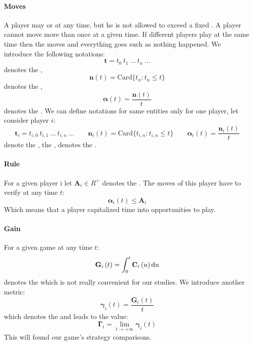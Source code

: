 \paragraph{Moves}
A player may  or  at any time, but he is
not allowed to exceed a fixed . A player cannot move  
more than once at a given time. If different players play at the same time then 
the moves  and everything goes such as nothing happened. We      
introduce the following notations:
\[ \textbf{t} = t_0 \: t_1 \: \dots \: t_n \: \dots \]
denotes the ,
\newpage
\[ \textbf{n} \left( t \right) = \mathrm{Card} \{t_n : t_n \leq t \} \]
denotes the ,
\[ \boldsymbol\alpha \left( t \right) = \frac{ \textbf{n} \left( t \right) }{t} \]
denotes the . We can define notations 
for same entities only for one player, let consider player $ i $:
\[ \textbf{t}_i = t_{i,0} \: t_{i,1} \: \dots \: t_{i,n} \: \dots
\qquad \textbf{n}_i \left( t \right) = \mathrm{Card} \{t_{i,n} : t_{i,n} \leq t \}
\qquad \boldsymbol\alpha_i \left( t \right) = \frac{ \textbf{n}_i \left( t \right) }{t} \]
denote the , the , denotes the      
.

\paragraph{Rule}
For a given player i let $ \textbf{A}_i \in R^+ $ denotes the . The moves of this player have to verify
at any time $ t $:
\[ \boldsymbol\alpha_i \left( t \right) \leq \textbf{A}_i \]
Which means that a player capitalized time into opportunities to play.

\paragraph{Gain}
For a given game at any time $ t $:
\[ \textbf{G}_i \left( t \right) = \int_{0}^{t} \textbf{C}_i \left( u \right) \mathrm{d} u \]
denotes the  which is not really
convenient for our studies. We introduce another metric:
\[ \boldsymbol\gamma_i \left( t \right) = \frac{\textbf{G}_i \left( t \right)}{t} \]
which denotes the  and
leads to the value:
\[ \boldsymbol\Gamma_i = \lim_{ t \rightarrow +\infty} \boldsymbol\gamma_i \left( t \right) \]
This  will found our game's strategy comparisons.


